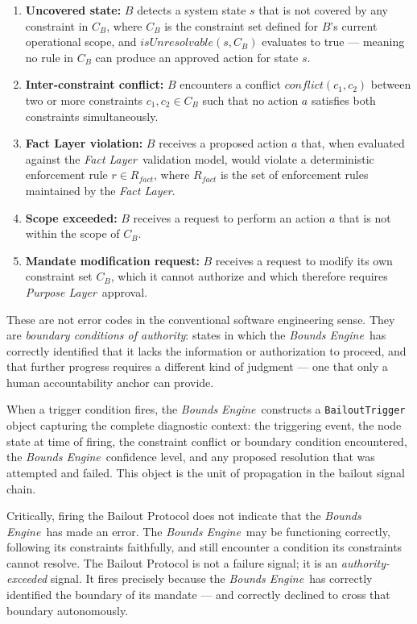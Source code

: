\documentclass[12pt]{article}
\newcommand{\purpose}{\textit{Purpose Layer}}
\newcommand{\bounds}{\textit{Bounds Engine}}
\newcommand{\fact}{\textit{Fact Layer}}
\begin{document}
\begin{enumerate}
\item \textbf{Uncovered state:} $B$ detects a system state $s$ that is not covered by any constraint in $C_B$, where $C_B$ is the constraint set defined for $B$'s current operational scope, and $isUnresolvable(s, C_B)$ evaluates to true --- meaning no rule in $C_B$ can produce an approved action for state $s$.

\item \textbf{Inter-constraint conflict:} $B$ encounters a conflict $conflict(c_1, c_2)$ between two or more constraints $c_1, c_2 \in C_B$ such that no action $a$ satisfies both constraints simultaneously.

\item \textbf{Fact Layer violation:} $B$ receives a proposed action $a$ that, when evaluated against the \fact\ validation model, would violate a deterministic enforcement rule $r \in R_{fact}$, where $R_{fact}$ is the set of enforcement rules maintained by the \fact.

\item \textbf{Scope exceeded:} $B$ receives a request to perform an action $a$ that is not within the scope of $C_B$.

\item \textbf{Mandate modification request:} $B$ receives a request to modify its own constraint set $C_B$, which it cannot authorize and which therefore requires \purpose\ approval.
\end{enumerate}

These are not error codes in the conventional software engineering sense. They are \textit{boundary conditions of authority}: states in which the \bounds\ has correctly identified that it lacks the information or authorization to proceed, and that further progress requires a different kind of judgment --- one that only a human accountability anchor can provide.

When a trigger condition fires, the \bounds\ constructs a \texttt{BailoutTrigger} object capturing the complete diagnostic context: the triggering event, the node state at time of firing, the constraint conflict or boundary condition encountered, the \bounds\ confidence level, and any proposed resolution that was attempted and failed. This object is the unit of propagation in the bailout signal chain.

Critically, firing the Bailout Protocol does not indicate that the \bounds\ has made an error. The \bounds\ may be functioning correctly, following its constraints faithfully, and still encounter a condition its constraints cannot resolve. The Bailout Protocol is not a failure signal; it is an \textit{authority-exceeded} signal. It fires precisely because the \bounds\ has correctly identified the boundary of its mandate --- and correctly declined to cross that boundary autonomously.
\end{document}
